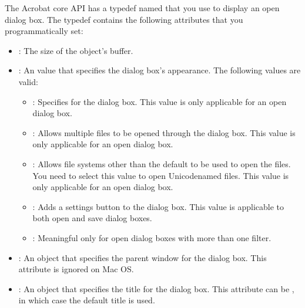 \documentclass[letterpaper,12pt,english,openany,oneside]{sphinxmanual}
\begin{document}
The Acrobat core API has a typedef named  that you use to display an open dialog box. The  typedef contains the following attributes that you programmatic\sphinxhyphen{}ally set:
\begin{itemize}
\item {} 
: The size of the  object’s buffer.

\item {} 
: An  value that specifies the dialog box’s appearance. The following values are valid:
\begin{itemize}
\item {} 
: Specifies   for the dialog box. This value is only applicable for an open dialog box.

\item {} 
: Allows multiple files to be opened through the dialog box. This value is only applicable for an open dialog box.

\item {} 
: Allows file systems other than the default to be used to open the files. You need to select this value to open Unicode\sphinxhyphen{}named files. This value is only applicable for an open dialog box.

\item {} 
: Adds a settings button to the dialog box. This value is applicable to both open and save dialog boxes.

\item {} 
: Meaningful only for open dialog boxes with more than one filter.

\end{itemize}

\item {} 
: An  object that specifies the parent window for the dialog box. This attribute is ignored on Mac OS.

\item {} 
: An  object that specifies the title for the dialog box. This attribute can be , in which case the default title is used.


\end{itemize}
\end{document}
